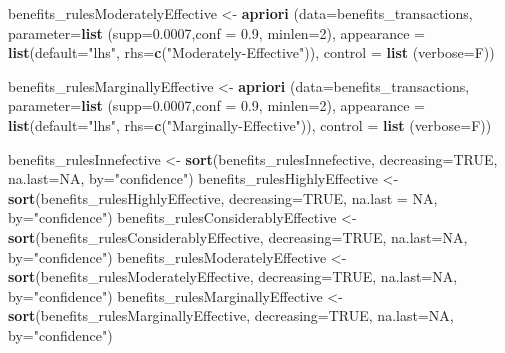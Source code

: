 \documentclass[spanish,]{article}
\newenvironment{Shaded}{\begin{snugshade}}{\end{snugshade}}
\newcommand{\KeywordTok}[1]{\textcolor[rgb]{0.13,0.29,0.53}{\textbf{#1}}}
\newcommand{\DataTypeTok}[1]{\textcolor[rgb]{0.13,0.29,0.53}{#1}}
\newcommand{\DecValTok}[1]{\textcolor[rgb]{0.00,0.00,0.81}{#1}}
\newcommand{\FloatTok}[1]{\textcolor[rgb]{0.00,0.00,0.81}{#1}}
\newcommand{\StringTok}[1]{\textcolor[rgb]{0.31,0.60,0.02}{#1}}
\newcommand{\OtherTok}[1]{\textcolor[rgb]{0.56,0.35,0.01}{#1}}
\newcommand{\NormalTok}[1]{#1}
\begin{document}
\begin{Shaded}
\begin{Highlighting}[]
\NormalTok{benefits_rulesModeratelyEffective <-}\StringTok{ }\KeywordTok{apriori}\NormalTok{ (}\DataTypeTok{data=}\NormalTok{benefits_transactions, }
                              \DataTypeTok{parameter=}\KeywordTok{list}\NormalTok{ (}\DataTypeTok{supp=}\FloatTok{0.0007}\NormalTok{,}\DataTypeTok{conf =} \FloatTok{0.9}\NormalTok{, }\DataTypeTok{minlen=}\DecValTok{2}\NormalTok{), }
                              \DataTypeTok{appearance =} \KeywordTok{list}\NormalTok{(}\DataTypeTok{default=}\StringTok{"lhs"}\NormalTok{,}
                                                \DataTypeTok{rhs=}\KeywordTok{c}\NormalTok{(}\StringTok{"Moderately-Effective"}\NormalTok{)), }
                              \DataTypeTok{control =} \KeywordTok{list}\NormalTok{ (}\DataTypeTok{verbose=}\NormalTok{F))}

\NormalTok{benefits_rulesMarginallyEffective <-}\StringTok{ }\KeywordTok{apriori}\NormalTok{ (}\DataTypeTok{data=}\NormalTok{benefits_transactions, }
                             \DataTypeTok{parameter=}\KeywordTok{list}\NormalTok{ (}\DataTypeTok{supp=}\FloatTok{0.0007}\NormalTok{,}\DataTypeTok{conf =} \FloatTok{0.9}\NormalTok{, }\DataTypeTok{minlen=}\DecValTok{2}\NormalTok{), }
                             \DataTypeTok{appearance =} \KeywordTok{list}\NormalTok{(}\DataTypeTok{default=}\StringTok{"lhs"}\NormalTok{,}
                                               \DataTypeTok{rhs=}\KeywordTok{c}\NormalTok{(}\StringTok{"Marginally-Effective"}\NormalTok{)), }
                             \DataTypeTok{control =} \KeywordTok{list}\NormalTok{ (}\DataTypeTok{verbose=}\NormalTok{F))}

\NormalTok{benefits_rulesInnefective <-}\StringTok{ }
\StringTok{  }\KeywordTok{sort}\NormalTok{(benefits_rulesInnefective, }\DataTypeTok{decreasing=}\OtherTok{TRUE}\NormalTok{, }\DataTypeTok{na.last=}\OtherTok{NA}\NormalTok{, }\DataTypeTok{by=}\StringTok{"confidence"}\NormalTok{)}
\NormalTok{benefits_rulesHighlyEffective <-}\StringTok{ }
\StringTok{  }\KeywordTok{sort}\NormalTok{(benefits_rulesHighlyEffective, }\DataTypeTok{decreasing=}\OtherTok{TRUE}\NormalTok{, }\DataTypeTok{na.last =} \OtherTok{NA}\NormalTok{, }\DataTypeTok{by=}\StringTok{"confidence"}\NormalTok{)}
\NormalTok{benefits_rulesConsiderablyEffective <-}\StringTok{ }
\StringTok{  }\KeywordTok{sort}\NormalTok{(benefits_rulesConsiderablyEffective, }\DataTypeTok{decreasing=}\OtherTok{TRUE}\NormalTok{, }\DataTypeTok{na.last=}\OtherTok{NA}\NormalTok{, }\DataTypeTok{by=}\StringTok{"confidence"}\NormalTok{)}
\NormalTok{benefits_rulesModeratelyEffective <-}\StringTok{ }
\StringTok{  }\KeywordTok{sort}\NormalTok{(benefits_rulesModeratelyEffective, }\DataTypeTok{decreasing=}\OtherTok{TRUE}\NormalTok{, }\DataTypeTok{na.last=}\OtherTok{NA}\NormalTok{, }\DataTypeTok{by=}\StringTok{"confidence"}\NormalTok{)}
\NormalTok{benefits_rulesMarginallyEffective <-}\StringTok{ }
\StringTok{  }\KeywordTok{sort}\NormalTok{(benefits_rulesMarginallyEffective, }\DataTypeTok{decreasing=}\OtherTok{TRUE}\NormalTok{, }\DataTypeTok{na.last=}\OtherTok{NA}\NormalTok{, }\DataTypeTok{by=}\StringTok{"confidence"}\NormalTok{)}
\end{Highlighting}
\end{Shaded}
\end{document}
